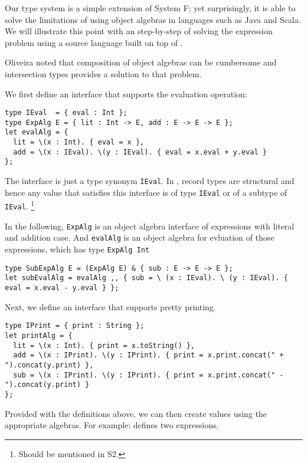 Our type system is a simple extension of System F; yet surprisingly, it
is able to solve the limitations of using object algebras in languages such as
Java and Scala. We will illustrate this point with an step-by-step of solving
the expression problem using a source language built on top of \name.

Oliveira noted that composition of object algebras can be cumbersome and
intersection types provides a solution to that problem.

We first define an interface that supports the evaluation operation:

\begin{lstlisting}
type IEval  = { eval : Int };
type ExpAlg E = { lit : Int -> E, add : E -> E -> E };
let evalAlg = {
  lit = \(x : Int). { eval = x },
  add = \(x : IEval). \(y : IEval). { eval = x.eval + y.eval }
};
\end{lstlisting}

The interface is just a type synonym \lstinline{IEval}. In \name, record
types are structural and hence any value that satisfies this interface is of
type \lstinline{IEval} or of a subtype of \lstinline{IEval}. \footnote{Should be
mentioned in S2.}

In the following, \lstinline{ExpAlg} is an object algebra interface of
expressions with literal and addition case. And \lstinline{evalAlg} is an object
algebra for evluation of those expressions, which has type \lstinline{ExpAlg Int}

\begin{lstlisting}
type SubExpAlg E = (ExpAlg E) & { sub : E -> E -> E };
let subEvalAlg = evalAlg ,, { sub = \ (x : IEval). \ (y : IEval). { eval = x.eval - y.eval } };
\end{lstlisting}

Next, we define an interface that supports pretty printing.

\begin{lstlisting}
type IPrint = { print : String };
let printAlg = {
  lit = \(x : Int). { print = x.toString() },
  add = \(x : IPrint). \(y : IPrint). { print = x.print.concat(" + ").concat(y.print) },
  sub = \(x : IPrint). \(y : IPrint). { print = x.print.concat(" - ").concat(y.print) }
};
\end{lstlisting}

Provided with the definitions above, we can then create values using the
appropriate algebras. For example:
defines two expressions.

